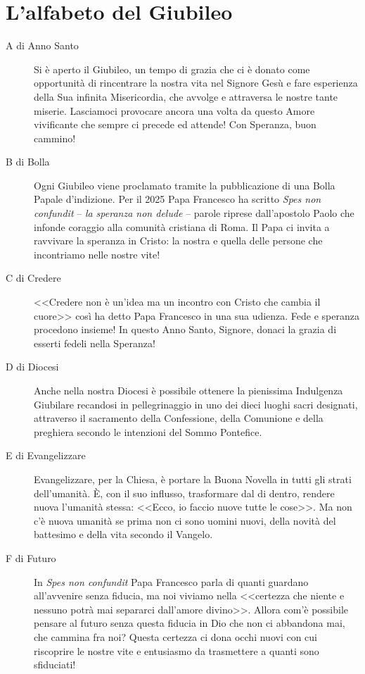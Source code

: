 \section{L'alfabeto del Giubileo}

\begin{description}
  \item[A di Anno Santo] Si è aperto il Giubileo, un tempo di grazia che ci è donato come opportunità di rincentrare la nostra vita nel Signore Gesù e fare esperienza della Sua infinita Misericordia, che avvolge e attraversa le nostre tante miserie. Lasciamoci provocare ancora una volta da questo Amore vivificante che sempre ci precede ed attende! Con Speranza, buon cammino!

  \item[B di Bolla] Ogni Giubileo viene proclamato tramite la pubblicazione di una Bolla Papale d'indizione. Per il 2025 Papa Francesco ha scritto \textit{Spes non confundit} -- \textit{la speranza non delude} -- parole riprese dall'apostolo Paolo che infonde coraggio alla comunità cristiana di Roma. Il Papa ci invita a ravvivare la speranza in Cristo: la nostra e quella delle persone che incontriamo nelle nostre vite!

  \item[C di Credere] <<Credere non è un'idea ma un incontro con Cristo che cambia il cuore>> così ha detto Papa Francesco in una sua udienza. Fede e speranza procedono insieme! In questo Anno Santo, Signore, donaci la grazia di esserti fedeli nella Speranza!

  \item[D di Diocesi] Anche nella nostra Diocesi è possibile ottenere la pienissima Indulgenza Giubilare recandosi in pellegrinaggio in uno dei dieci luoghi sacri designati, attraverso il sacramento della Confessione, della Comunione e della preghiera secondo le intenzioni del Sommo Pontefice.

  \item[E di Evangelizzare] Evangelizzare, per la Chiesa, è portare la Buona Novella in tutti gli strati dell'umanità. È, con il suo influsso, trasformare dal di dentro, rendere nuova l'umanità stessa: <<Ecco, io faccio nuove tutte le cose>>. Ma non c'è nuova umanità se prima non ci sono uomini nuovi, della novità del battesimo e della vita secondo il Vangelo.

  \item[F di Futuro] In \textit{Spes non confundit} Papa Francesco parla di quanti guardano all'avvenire senza fiducia, ma noi viviamo nella <<certezza che niente e nessuno potrà mai separarci dall'amore divino>>. Allora com'è possibile pensare al futuro senza questa fiducia in Dio che non ci abbandona mai, che cammina fra noi? Questa certezza ci dona occhi nuovi con cui riscoprire le nostre vite e entusiasmo da trasmettere a quanti sono sfiduciati!


\end{description}
